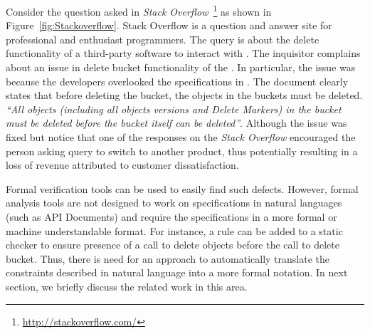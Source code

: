 Consider the question asked in \textit{Stack Overflow}~\footnote{\url{http://stackoverflow.com/}} as shown in Figure~\ref{fig:Stackoverflow}.
Stack Overflow is a question and answer site for professional and enthusiast programmers.
The query is about the delete functionality of a third-party software  to interact with \amazonAPI.
The inquisitor complains about an issue in delete bucket functionality of the .
In particular, the issue was because the  developers overlooked the specifications in \amazon.
The document clearly states that before deleting the bucket, the objects in the buckets must be deleted. \textit{``All objects (including all objects versions and Delete Markers) in the bucket must be deleted before the bucket itself can be deleted''}.
Although the issue was fixed but notice that one of the responses on the \textit{Stack Overflow} encouraged the person asking query to switch to another product, thus potentially resulting in a loss of revenue attributed to customer dissatisfaction.



Formal verification tools can be used to easily find such defects.
However, formal analysis tools are not designed to work on specifications in natural languages (such as API Documents) and require the specifications in a more formal or machine understandable format.
For instance, a rule can be added to a static checker to ensure presence of a call to delete objects before the call to delete bucket.
Thus, there is need for an approach to automatically translate the constraints described in natural language into a more formal notation. In next section, we briefly discuss the related work in this area.




 








